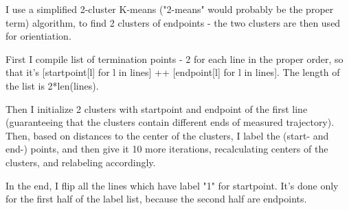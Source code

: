 \documentclass[11pt]{article}
\begin{document}
    I use a simplified 2-cluster K-means ("2-means" would probably be the
proper term) algorithm, to find 2 clusters of endpoints - the two
clusters are then used for orientiation.

First I compile list of termination points - 2 for each line in the
proper order, so that it's {[}startpoint{[}l{]} for l in lines{]} ++
{[}endpoint{[}l{]} for l in lines{]}. The length of the list is
2*len(lines).

Then I initialize 2 clusters with startpoint and endpoint of the first
line (guaranteeing that the clusters contain different ends of measured
trajectory). Then, based on distances to the center of the clusters, I
label the (start- and end-) points, and then give it 10 more iterations,
recalculating centers of the clusters, and relabeling accordingly.

In the end, I flip all the lines which have label "1" for startpoint.
It's done only for the first half of the label list, because the second
half are endpoints.
\end{document}
